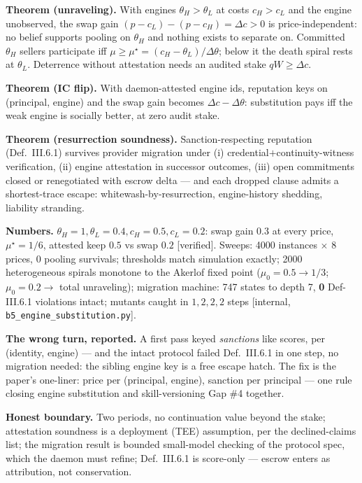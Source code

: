 \documentclass[11pt,a4paper]{article}
\begin{document}
\begin{thebox}
\textbf{Theorem (unraveling).} With engines $\theta_H > \theta_L$ at costs $c_H > c_L$ and the engine unobserved, the swap gain $(p-c_L)-(p-c_H)=\Delta c>0$ is price-independent: no belief supports pooling on $\theta_H$ and nothing exists to separate on. Committed $\theta_H$ sellers participate iff $\mu \ge \mu^\star = (c_H-\theta_L)/\Delta\theta$; below it the death spiral rests at $\theta_L$. Deterrence without attestation needs an audited stake $qW \ge \Delta c$.

\textbf{Theorem (IC flip).} With daemon-attested engine ids, reputation keys on (principal, engine) and the swap gain becomes $\Delta c - \Delta\theta$: substitution pays iff the weak engine is socially better, at zero audit stake.

\textbf{Theorem (resurrection soundness).} Sanction-respecting reputation (Def.~III.6.1) survives provider migration under (i) credential$+$continuity-witness verification, (ii) engine attestation in successor outcomes, (iii) open commitments closed or renegotiated with escrow delta --- and each dropped clause admits a shortest-trace escape: whitewash-by-resurrection, engine-history shedding, liability stranding.
\end{thebox}

\textbf{Numbers.} $\theta_H{=}1,\theta_L{=}0.4,c_H{=}0.5,c_L{=}0.2$: swap gain $0.3$ at every price, $\mu^\star = 1/6$, attested keep $0.5$ vs swap $0.2$ [verified]. Sweeps: 4000 instances $\times$ 8 prices, 0 pooling survivals; thresholds match simulation exactly; 2000 heterogeneous spirals monotone to the Akerlof fixed point ($\mu_0{=}0.5 \to 1/3$; $\mu_0{=}0.2 \to$ total unraveling); migration machine: 747 states to depth 7, \textbf{0} Def-III.6.1 violations intact; mutants caught in $1,2,2,2$ steps [internal, \texttt{b5\_engine\_substitution.py}].

\textbf{The wrong turn, reported.} A first pass keyed \emph{sanctions} like scores, per (identity, engine) --- and the intact protocol failed Def.~III.6.1 in one step, no migration needed: the sibling engine key is a free escape hatch. The fix is the paper's one-liner: price per (principal, engine), sanction per principal --- one rule closing engine substitution and skill-versioning Gap \#4 together.

\begin{boundary}
\textbf{Honest boundary.} Two periods, no continuation value beyond the stake; attestation soundness is a deployment (TEE) assumption, per the declined-claims list; the migration result is bounded small-model checking of the protocol spec, which the daemon must refine; Def.~III.6.1 is score-only --- escrow enters as attribution, not conservation.
\end{boundary}
\end{document}
